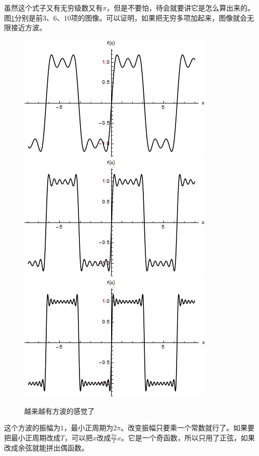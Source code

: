虽然这个式子又有无穷级数又有$\pi$，但是不要怕，待会就要讲它是怎么算出来的。图\ref{fig-trigo-square-wave}分别是前$3$、$6$、10项的图像。可以证明，如果把无穷多项加起来，图像就会无限接近方波。
\begin{figure}[htb]
\centering
\includegraphics[scale=0.4]{fig/trigo-square-wave.png}
\includegraphics[scale=0.4]{fig/trigo-square-wave-2.png}
\includegraphics[scale=0.4]{fig/trigo-square-wave-3.png}
\caption{越来越有方波的感觉了}
\label{fig-trigo-square-wave}
\end{figure}

这个方波的振幅为$1$，最小正周期为$2 \pi$。改变振幅只要乘一个常数就行了。如果要把最小正周期改成$T$，可以把$x$改成$\frac{2 \pi}{T} x$。它是一个奇函数，所以只用了正弦，如果改成余弦就能拼出偶函数。

